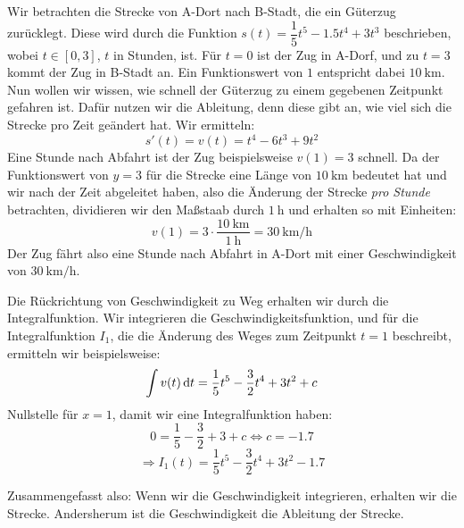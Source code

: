 \documentclass[ngerman, 12pt]{nssheetxea}
\begin{document}
\begin{example}
Wir betrachten die Strecke von A-Dort nach B-Stadt, die ein Güterzug zurücklegt. Diese wird durch die Funktion $s(t)=\dfrac{1}{5}t^5-1.5t^4+3t^3$ beschrieben, wobei $t\in [0,3]$, $t$ in Stunden, ist. Für $t=0$ ist der Zug in A-Dorf, und zu $t=3$ kommt der Zug in B-Stadt an. Ein Funktionswert von $1$ entspricht dabei $\SI{10}{\kilo\meter}$. Nun wollen wir wissen, wie schnell der Güterzug zu einem gegebenen Zeitpunkt gefahren ist. Dafür nutzen wir die Ableitung, denn diese gibt an, wie viel sich die Strecke pro Zeit geändert hat. Wir ermitteln: 
\[ s'(t) = v(t)=t^4-6t^3+9t^2\]
Eine Stunde nach Abfahrt ist der Zug beispielsweise $v(1)=3$ schnell. Da der Funktionswert von $y=3$ für die Strecke eine Länge von $\SI{10}{\kilo\meter}$ bedeutet hat und wir nach der Zeit abgeleitet haben, also die Änderung der Strecke \textit{pro Stunde} betrachten, dividieren wir den Maßstaab durch $\SI{1}{\hour}$ und erhalten so mit Einheiten:
\[ v(1) = 3 \cdot \dfrac{\SI{10}{\kilo\meter}}{\SI{1}{\hour}} = \SI{30}{\kilo\meter\per\hour}\]
Der Zug fährt also eine Stunde nach Abfahrt in A-Dort mit einer Geschwindigkeit von $\SI{30}{\kilo\meter\per\hour}$. \par
Die Rückrichtung von Geschwindigkeit zu Weg erhalten wir durch die Integralfunktion. Wir integrieren die Geschwindigkeitsfunktion, und für die Integralfunktion $I_1$, die die Änderung des Weges zum Zeitpunkt $t=1$ beschreibt, ermitteln wir beispielsweise:
\[ \int v(t) \mathop{}\!\mathrm{d} t = \dfrac{1}{5}t^5 - \dfrac{3}{2}t^4+3t^2 + c\]
Nullstelle für $x=1$, damit wir eine Integralfunktion haben:
\[ 0 = \dfrac{1}{5}-\dfrac{3}{2}+3+c \Leftrightarrow c = -\num{1,7}\]
\[ \Rightarrow I_1(t) = \dfrac{1}{5}t^5 - \dfrac{3}{2}t^4+3t^2 -\num{1,7}\]
\begin{center}
\end{center}
Zusammengefasst also: Wenn wir die Geschwindigkeit integrieren, erhalten wir die Strecke. Andersherum ist die Geschwindigkeit die Ableitung der Strecke.
\end{example}
\end{document}

